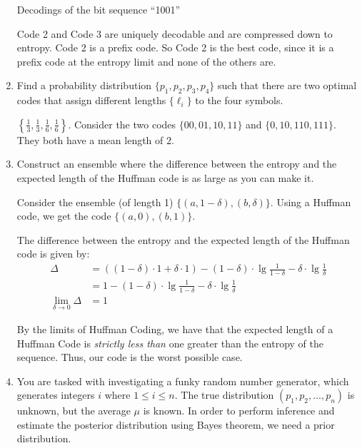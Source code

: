 \documentclass[10pt,\jkfside,a4paper]{article}
\begin{document}
\begin{enumerate}
\begin{table}[H]
        \caption{Decodings of the bit sequence ``1001''}

    \end{table}

    Code 2 and Code 3 are uniquely decodable and are compressed down to entropy. Code 2 is a prefix code. So Code 2 is the best code, since it is a prefix code at the entropy limit and none of the others are.

    \item Find a probability distribution $\{p_1, p_2, p_3, p_4\}$ such that there are two optimal codes that assign different lengths $\{\ell_i\}$ to the four symbols.

    $\left\{\frac13, \frac13, \frac16, \frac16\right\}$. Consider the two codes $\{00, 01, 10, 11\}$ and $\{0, 10, 110, 111\}$. They both have a mean length of $2$.

    \item Construct an ensemble where the difference between the entropy and the expected length of the Huffman code is as large as you can make it.

    Consider the ensemble (of length 1) $\{(a, 1 - \delta), (b, \delta)\}$. Using a Huffman code, we get the code $\{(a, 0), (b, 1)\}$.

    The difference between the entropy and the expected length of the Huffman code is given by:
    \begin{align}
        \Delta
        &= ((1 - \delta) \cdot 1 + \delta \cdot 1) - (1 - \delta) \cdot \lg \frac{1}{1 - \delta} - \delta \cdot \lg \frac{1}{\delta} \\
        &= 1 - (1 - \delta) \cdot \lg \frac{1}{1 - \delta} - \delta \cdot \lg \frac{1}{\delta} \\
        \lim_{\delta \to 0} \Delta &= 1
    \end{align}

    By the limits of Huffman Coding, we have that the expected length of a Huffman Code is \textit{strictly less than} one greater than the entropy of the sequence. Thus, our code is the worst possible case.

    \item You are tasked with investigating a funky random number generator, which generates integers $i$ where $1 \le i \le n$. The true distribution $(p_1, p_2, \ldots, p_n)$ is unknown, but the average $\mu$
    is known. In order to perform inference and estimate the posterior distribution using Bayes theorem, we need a prior distribution.


\end{enumerate}
\end{document}
